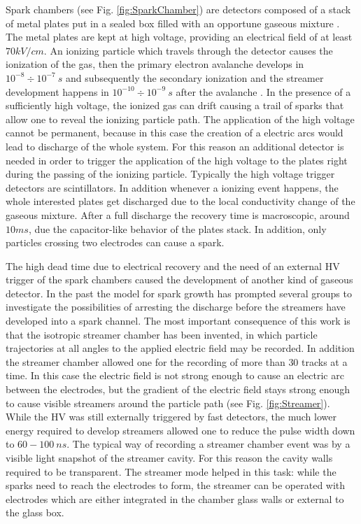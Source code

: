 Spark chambers (see Fig. \ref{fig:SparkChamber}) are detectors composed of a stack of metal plates put in a sealed box filled with an opportune gaseous mixture \cite{wenzel:1966}.
The metal plates are kept at high voltage, providing an electrical field of at least $70 kV/cm$.
An ionizing particle which travels through the detector causes the ionization of the gas, then the primary electron avalanche develops in $10^{-8}\div10^{-7}\ s$ and subsequently the secondary ionization and the streamer development happens in $10^{-10}\div10^{-9}\ s$ after the avalanche \cite{wenzel:1966}.
In the presence of a sufficiently high voltage, the ionized gas can drift causing a trail of sparks that allow one to reveal the ionizing particle path.
The application of the high voltage cannot be permanent, because in this case the creation of a electric arcs would lead to discharge of the whole system.
For this reason an additional detector is needed in order to trigger the application of the high voltage to the plates right during the passing of the ionizing particle.
Typically the high voltage trigger detectors are scintillators. 
In addition whenever a ionizing event happens, the whole interested plates get discharged due to the local conductivity change of the gaseous mixture.
After a full discharge the recovery time is macroscopic, around $10ms$, due the capacitor-like behavior of the plates stack.
In addition, only particles crossing two electrodes can cause a spark.

The high dead time due to electrical recovery and the need of an external HV trigger of the spark chambers caused the development of another kind of gaseous detector.
In the past the model for spark growth has prompted several groups \cite{chicovani:1964} to investigate the possibilities of arresting the discharge before the streamers have developed into a spark channel.
The most important consequence of this work is that the isotropic streamer chamber has been invented, in which particle trajectories at all angles to the applied electric field may be recorded.
In addition the streamer chamber allowed one for the recording of more than $30$ tracks at a time.
In this case the electric field is not strong enough to cause an electric arc between the electrodes, but the gradient of the electric field stays strong enough to cause visible streamers around the particle path (see Fig. \ref{fig:Streamer}).
While the HV was still externally triggered by fast detectors, the much lower energy required to develop streamers allowed one to reduce the pulse width down to $60-100\ ns$.
The typical way of recording a streamer chamber event was by a visible light snapshot of the streamer cavity.
For this reason the cavity walls required to be transparent.
The streamer mode helped in this task: while the sparks need to reach the electrodes to form, the streamer can be operated with electrodes which are either integrated in the chamber glass walls or external to the glass box.

